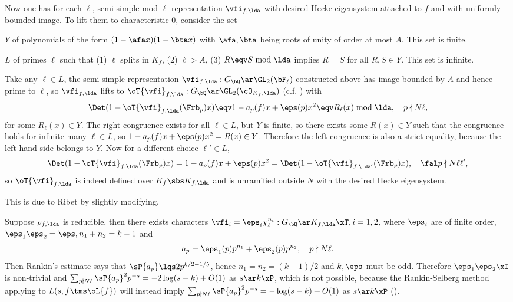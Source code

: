\documentclass[a4paper, twoside]{article}
\begin{document}
\begin{prf}
	Now one has for each $\ell$, semi-simple mod-$\ell$ representation $\vfi_{f,\lda}$ with desired Hecke eigensystem attached to $f$ and with uniformly bounded image. To lift them to characteristic $0$, consider the set
	\begin{itm}
		\item $Y$ of polynomials of the form $(1-\afa x)(1-\bta x)$ with $\afa,\bta$ being roots of unity of order at most $A$. This set is finite.
		\item $L$ of primes $\ell$ such that (1) $\ell$ splits in $K_{f}$, (2) $\ell>A$, (3) $R\eqv S\bmod{\lda}$ implies $R=S$ for all $R,S\in Y$. This set is infinite.
	\end{itm}
	Take any $\ell\in L$, the semi-simple representation $\vfi_{f,\lda}:G_{\bQ}\ar\GL_{2}(\bF_{\ell})$ constructed above has image bounded by $A$ and hence prime to $\ell$, so $\vfi_{f,\lda}$ lifts to $\oT{\vfi}_{f,\lda}:G_{\bQ}\ar\GL_{2}(\cO_{K_{f},\lda})$ (c.f. \cite[4.4]{Feit1967}) with
	\[
		\Det(1-\oT{\vfi}_{f,\lda}(\Frb_{p})x)\eqv1-a_{p}(f)x+\eps(p)x^{2}\eqv R_{\ell}(x)\bmod{\lda},\quad p\nmid N\ell,
	\]
	for some $R_{\ell}(x)\in Y$. The right congruence exists for all $\ell\in L$, but $Y$ is finite, so there exists some $R(x)\in Y$ such that the congruence holds for infinite many $\ell\in L$, so $1-a_{p}(f)x+\eps(p)x^{2}=R(x)\in Y$. Therefore the left congruence is also a strict equality, because the left hand side belongs to $Y$. Now for a different choice $\ell'\in L$,
	\[
		\Det(1-\oT{\vfi}_{f,\lda}(\Frb_{p})x)=1-a_{p}(f)x+\eps(p)x^{2}=\Det(1-\oT{\vfi}_{f,\lda'}(\Frb_{p})x),\quad \fal p\nmid N\ell\ell',
	\]
	so $\oT{\vfi}_{f,\lda}$ is indeed defined over $K_{f}\sbs K_{f,\lda}$ and is unramified outside $N$ with the desired Hecke eigensystem.


	 This is due to Ribet\cite[2.3]{Ribet1977} by slightly modifying\cite[8.7]{DS1974}.

	Suppose $\rho_{f,\lda}$ is reducible, then there exists characters $\vfi_{i}=\eps_{i}\chi_{\ell}^{n_{i}}:G_{\bQ}\ar K_{f,\lda}\xT, i=1,2$, where $\eps_{i}$ are of finite order, $\eps_{1}\eps_{2}=\eps, n_{1}+n_{2}=k-1$ and
	\[
		a_{p}=\eps_{1}(p)p^{n_{1}}+\eps_{2}(p)p^{n_{2}},\quad p\nmid N\ell.
	\]
	Then Rankin's estimate says that $\sP{a_{p}}\lqs2p^{k/2-1/5}$, hence $n_{1}=n_{2}=(k-1)/2$ and $k,\eps$ must be odd. Therefore $\eps_{1}\eps_{2}\xI$ is non-trivial and $\sum_{p\nmid N\ell}\sP{a_{p}}^{2}p^{-s}=-2\log(s-k)+O(1)$ as $s\ar k\xP$, which is not possible, because the Rankin-Selberg method applying to $L(s,f\tms\oL{f})$ will instead imply $\sum_{p\nmid N\ell}\sP{a_{p}}^{2}p^{-s}=-\log(s-k)+O(1)$ as $s\ar k\xP$ (\cite[5.1]{DS1974}).
\end{prf}
\end{document}
